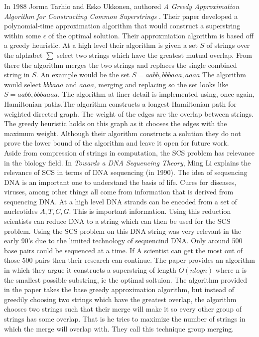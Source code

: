 \documentclass[letterpaper,11pt,titlepage]{article}
\begin{document}
In 1988 Jorma Tarhio and Esko Ukkonen, authored \textit{A Greedy Approximation Algorithm for Constructing Common Superstrings} \cite{tarhio1988greedy}. Their paper developed a polynomial-time approximation algorithm that would construct a superstring within some $\epsilon$ of the optimal solution. Their approxmiation algorithm is based off a greedy heuristic. At a high level their algorithm is given a set $S$ of strings over the alphabet $\sum$ select two strings which have the greatest mutual overlap. From there the algorithm merges the two strings and replaces the single combined string in $S$. An example would be the set $S = {aabb, bbbaaa, aaaa}$ The algorithm would select $bbbaaa$ and $aaaa$, merging and replacing so the set looks like $S = { aabb, bbbaaaa }$. The algorithm at finer detail is implemented using, once again, Hamiltonian paths.The algorithm constructs a longest Hamiltonian path for weighted directed graph. The weight of the edges are the overlap between strings. The greedy heuristic holds on this graph as it chooses the edges with the maximum weight. Although their algorithm constructs a solution they do not prove the lower bound of the algorithm and leave it open for future work. \\

Aside from compression of strings in computation, the SCS problem has relevance in the biology field. In \textit{Towards a DNA Sequencing Theory}, Ming Li explains the relevance of SCS in terms of DNA sequencing (in 1990). The idea of sequencing DNA is an important one to understand the basis of life. Cures for diseases, viruses, among other things all come from information that is derived from sequencing DNA. At a high level DNA strands can be encoded from a set of nucleotides $A, T, C, G$. This is important information. Using this reduction scientists can reduce DNA to a string which can then be used for the SCS problem. Using the SCS problem on this DNA string was very relevant in the early 90's due to the limited technology of sequencind DNA. Only around 500 base pairs could be sequenced at a time. If A scientist can get the most out of those 500 pairs then their research can continue. The paper provides an algorithm in which they argue it constructs a superstring of length $O(nlogn)$ where n is the smallest possible substring, ie the optimal soltuion. The algorithm provided in the paper takes the base greedy approximation algorithm, but instead of greedily choosing two strings which have the greatest overlap, the algorithm chooses two strings such that their merge will make it so every other group of strings has some overlap. That is he tries to maximize the number of strings in which the merge will overlap with. They call this technique group merging.\\
\end{document}
